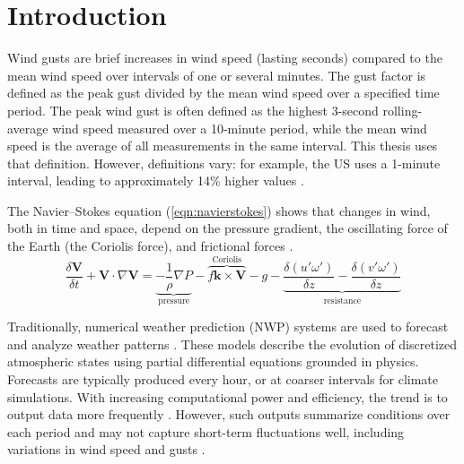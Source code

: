 
\chapter{Introduction} %

\label{Chapter1} %


\newcommand{\keyword}[1]{\textbf{#1}}
\newcommand{\tabhead}[1]{\textbf{#1}}
\newcommand{\code}[1]{\texttt{#1}}
\newcommand{\file}[1]{\texttt{\bfseries#1}}
\newcommand{\option}[1]{\texttt{\itshape#1}}

Wind gusts are brief increases in wind speed (lasting seconds) compared to the mean wind speed over intervals of one or several minutes. The gust factor is defined as the peak gust divided by the mean wind speed over a specified time period. The peak wind gust is often defined as the highest 3-second rolling-average wind speed measured over a 10-minute period, while the mean wind speed is the average of all measurements in the same interval. This thesis uses that definition. However, definitions vary: for example, the US uses a 1-minute interval, leading to approximately 14\% higher values \cite{why_wind_gusts}.

The Navier–Stokes equation (\ref{eqn:navierstokes}) shows that changes in wind, both in time and space, depend on the pressure gradient, the oscillating force of the Earth (the Coriolis force), and frictional forces \cite{uncertainties_in_numerical_weather_predictions}.
\begin{equation}
    \label{eqn:navierstokes}
    \frac{\delta \mathbf{V}}{\delta t} + \mathbf{V}\cdot\nabla\mathbf{V} = \underbrace{-\frac{1}{\rho}\nabla P}_{\text{pressure}} -\overbrace{ f\mathbf{k}\times\mathbf{V}}^{\text{Coriolis}} - g - \underbrace{\frac{\delta(u'\omega')}{\delta z} - \frac{\delta(v'\omega')}{\delta z}}_{\text{resistance}}
\end{equation}

Traditionally, numerical weather prediction (NWP) systems are used to forecast and analyze weather patterns \cite{medium_range_3d_weather_forecasting_NN}. These models describe the evolution of discretized atmospheric states using partial differential equations grounded in physics. Forecasts are typically produced every hour, or at coarser intervals for climate simulations. With increasing computational power and efficiency, the trend is to output data more frequently \cite{GNP_vidtal}. However, such outputs summarize conditions over each period and may not capture short-term fluctuations well, including variations in wind speed and gusts \cite{canNNBeatNWP}.

